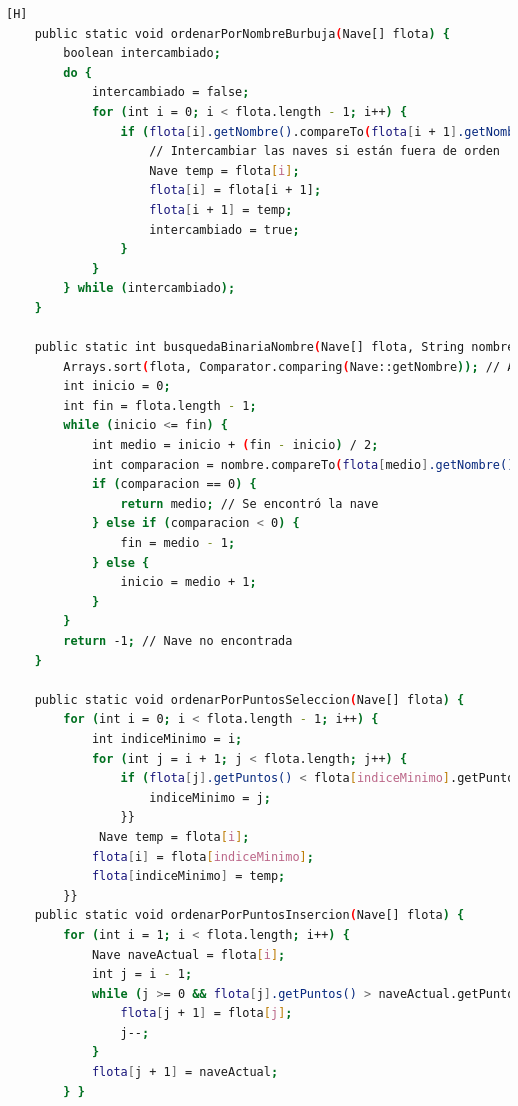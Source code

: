\documentclass{article}
\begin{document}
\begin{lstlisting}[language=bash,caption={Creando la clase Ejercito_vs}][H]
    public static void ordenarPorNombreBurbuja(Nave[] flota) {
        boolean intercambiado;
        do {
            intercambiado = false;
            for (int i = 0; i < flota.length - 1; i++) {
                if (flota[i].getNombre().compareTo(flota[i + 1].getNombre()) > 0) {
                    // Intercambiar las naves si están fuera de orden
                    Nave temp = flota[i];
                    flota[i] = flota[i + 1];
                    flota[i + 1] = temp;
                    intercambiado = true;
                }
            }
        } while (intercambiado);
    }

    public static int busquedaBinariaNombre(Nave[] flota, String nombre) {
        Arrays.sort(flota, Comparator.comparing(Nave::getNombre)); // Asegurar que el arreglo esté ordenado por nombre
        int inicio = 0;
        int fin = flota.length - 1;
        while (inicio <= fin) {
            int medio = inicio + (fin - inicio) / 2;
            int comparacion = nombre.compareTo(flota[medio].getNombre());
            if (comparacion == 0) {
                return medio; // Se encontró la nave
            } else if (comparacion < 0) {
                fin = medio - 1;
            } else {
                inicio = medio + 1;
            }
        }
        return -1; // Nave no encontrada
    }

    public static void ordenarPorPuntosSeleccion(Nave[] flota) {
        for (int i = 0; i < flota.length - 1; i++) {
            int indiceMinimo = i;
            for (int j = i + 1; j < flota.length; j++) {
                if (flota[j].getPuntos() < flota[indiceMinimo].getPuntos()) {
                    indiceMinimo = j;
                }}
             Nave temp = flota[i];
            flota[i] = flota[indiceMinimo];
            flota[indiceMinimo] = temp;
        }}
    public static void ordenarPorPuntosInsercion(Nave[] flota) {
        for (int i = 1; i < flota.length; i++) {
            Nave naveActual = flota[i];
            int j = i - 1;
            while (j >= 0 && flota[j].getPuntos() > naveActual.getPuntos()) {
                flota[j + 1] = flota[j];
                j--;
            }
            flota[j + 1] = naveActual;
        } }


\end{lstlisting}
\end{document}
